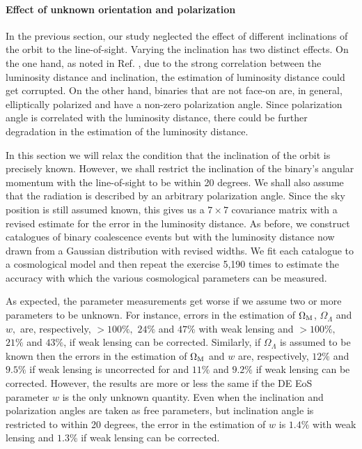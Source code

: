\paragraph{Effect of unknown orientation and polarization}
In the previous section, our study neglected the effect of different
inclinations of the orbit to the line-of-sight. Varying the inclination
has two distinct effects. On the one hand, as noted in
Ref. \cite{Nissanke:2009kt}, due to the strong correlation between
the luminosity distance and inclination, the estimation of luminosity
distance could get corrupted. On the other hand, binaries that are
not face-on are, in general, elliptically polarized and have a non-zero
polarization angle. Since polarization angle is correlated with the
luminosity distance, there could be further degradation in the
estimation of the luminosity distance.

In this section we will relax the condition that the inclination of the
orbit is precisely known. However, we shall restrict the inclination
of the binary's angular momentum with the line-of-sight to be within
20 degrees. We shall also assume that the radiation is described by
an arbitrary polarization angle. Since the sky position is still assumed known,
this gives us a $7\times 7$ covariance matrix with a revised estimate for the error in the
luminosity distance. As before, we construct catalogues of binary
coalescence events but with the luminosity distance now drawn from
a Gaussian distribution with revised widths. We fit each catalogue
to a cosmological model and then repeat the exercise 5,190 times to
estimate the accuracy with which the various cosmological parameters
can be measured.

As expected, the parameter measurements get worse if we assume two
or more parameters to be unknown.  For instance, errors in the estimation
of $\Omega_{\rm M}$, $\Omega_\Lambda$ and $w,$ are, respectively, $>100\%,$ $24\%$ and
$47\%$ with weak lensing and $>100\%,$ $21\%$ and $43\%$, if weak lensing
can be corrected. Similarly, if $\Omega_\Lambda$ is assumed to be known then
the errors in the estimation of $\Omega_{\rm M}$ and $w$ are, respectively,
$12\%$ and $9.5\%$ if weak lensing is uncorrected for and $11\%$ and
$9.2\%$ if weak lensing can be corrected. However, the results are
more or less the same if the DE EoS parameter $w$ is the only unknown
quantity. Even when the inclination and polarization angles are taken
as free parameters, but inclination angle is restricted to within 20
degrees, the error in the estimation of $w$ is $1.4\%$ with weak lensing
and $1.3\%$ if weak lensing can be corrected.

